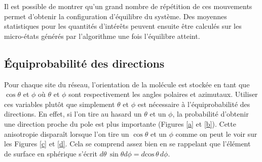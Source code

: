 \documentclass[11pt,a4paper]{article}
\numberwithin{equation}{section}
\begin{document}
Il est possible de montrer qu'un grand nombre de répétition de ces mouvements permet d'obtenir la configuration d'équilibre du système. Des moyennes statistiques pour les quantités d'intérêts peuvent ensuite être calculés sur les micro-états générés par l'algorithme une fois l'équilibre atteint.

\subsection{Équiprobabilité des directions}
Pour chaque site du réseau, l'orientation de la molécule est stockée en tant que $\cos \theta$ et $\phi$ où $\theta$ et $\phi$ sont respectivement les angles polaires et azimutaux. Utiliser ces variables plutôt que simplement $\theta$ et $\phi$ est nécessaire à l'équiprobabilité des directions. En effet, si l'on tire au hasard un $\theta$ et un $\phi$, la probabilité d'obtenir une direction proche du pole est plus importante (Figures \ref{a} et \ref{b}). Cette anisotropie disparaît lorsque l'on tire un $\cos \theta$ et un $\phi$ comme on peut le voir sur les Figures \ref{c} et \ref{d}. Cela se comprend assez bien en se rappelant que l'élément de surface en sphérique s'écrit $d\theta\, \sin \theta d\phi = d\text{cos}\,\theta\, d\phi$.
\end{document}
